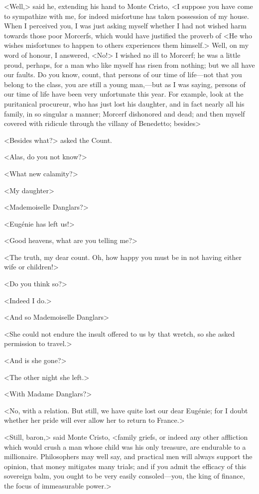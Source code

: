  <Well,> said he, extending his hand to Monte Cristo, <I suppose you have come to sympathize with me, for indeed misfortune has taken possession of my house. When I perceived you, I was just asking myself whether I had not wished harm towards those poor Morcerfs, which would have justified the proverb of <He who wishes misfortunes to happen to others experiences them himself.> Well, on my word of honour, I answered, <No!> I wished no ill to Morcerf; he was a little proud, perhaps, for a man who like myself has risen from nothing; but we all have our faults. Do you know, count, that persons of our time of life—not that you belong to the class, you are still a young man,—but as I was saying, persons of our time of life have been very unfortunate this year. For example, look at the puritanical procureur, who has just lost his daughter, and in fact nearly all his family, in so singular a manner; Morcerf dishonored and dead; and then myself covered with ridicule through the villany of Benedetto; besides\longdash> 

 <Besides what?> asked the Count. 

 <Alas, do you not know?> 

 <What new calamity?> 

 <My daughter\longdash> 

 <Mademoiselle Danglars?> 

 <Eugénie has left us!> 

 <Good heavens, what are you telling me?> 

 <The truth, my dear count. Oh, how happy you must be in not having either wife or children!> 

 <Do you think so?> 

 <Indeed I do.> 

 <And so Mademoiselle Danglars\longdash> 

 <She could not endure the insult offered to us by that wretch, so she asked permission to travel.> 

 <And is she gone?> 

 <The other night she left.> 

 <With Madame Danglars?> 

 <No, with a relation. But still, we have quite lost our dear Eugénie; for I doubt whether her pride will ever allow her to return to France.> 

 <Still, baron,> said Monte Cristo, <family griefs, or indeed any other affliction which would crush a man whose child was his only treasure, are endurable to a millionaire. Philosophers may well say, and practical men will always support the opinion, that money mitigates many trials; and if you admit the efficacy of this sovereign balm, you ought to be very easily consoled—you, the king of finance, the focus of immeasurable power.> 

